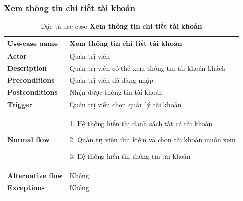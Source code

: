         \subsubsection{Xem thông tin chi tiết tài khoản}
            \begin{longtable}{| p{} | p{} |} 
                \hline
                    \textbf{Use-case name} 
                & 
                    Xem thông tin chi tiết tài khoản
                \\
                \hline
                    \textbf{Actor} 
                & 
                    Quản trị viên
                \\
                \hline
                    \textbf{Description} 
                & 
                    Quản trị viên có thể xem thông tin tài khoản khách
                \\
                \hline
                    \textbf{Preconditions} 
                &
                    Quản trị viên đã đăng nhập
                \\
                \hline
                    \textbf{Postconditions} 
                & 
                    Nhận được thông tin tài khoản
                \\
                \hline
                    \textbf{Trigger} 
                & 
                    Quản trị viên chọn quản lý tài khoản
                \\
                \hline
                \begin{flushleft}
                    \textbf{Normal flow}
                \end{flushleft}
                & 
                1. Hệ thống hiển thị danh sách tất cả tài khoản
                    
                    2. Quản trị viên tìm kiếm và chọn tài khoản muốn xem
                    
                    3. Hệ thống hiển thị thông tin tài khoản
                \\
                \hline
                    \textbf{Alternative flow}
                &
                    Không
                \\
                \hline
                    \textbf{Exceptions} 
                &
                    Không
                \\
                \hline
                \caption{Đặc tả use-case \textbf{Xem thông tin chi tiết tài khoản}}
            \end{longtable}


